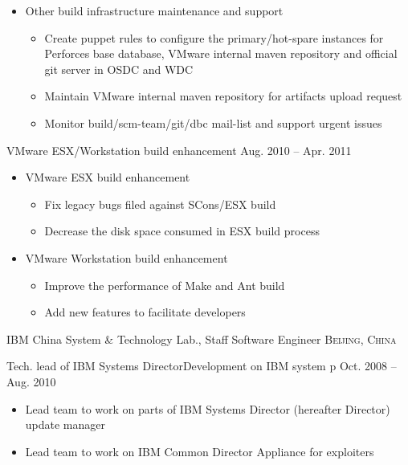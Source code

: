 \documentclass[10pt,letterpaper]{article}
\begin{document}
{{\begin{itemize}
\begin{itemize}
                \item   Maintain VMware legacy gitorious server and fix bugs
            \end{itemize}
        \item Other build infrastructure maintenance and support
            \begin{itemize}
                \item   Create puppet rules to configure the primary/hot-spare instances for
                    Perforces base database, VMware internal maven repository and official git
                    server in OSDC and WDC
                \item   Maintain VMware internal maven repository for artifacts upload request
                \item   Monitor build/scm-team/git/dbc mail-list and support urgent issues
            \end{itemize}

    \end{itemize}
}
\headedsubsection %
{VMware ESX/Workstation build enhancement} {Aug. 2010 -- Apr. 2011}
{
    \begin{itemize}
        \item VMware ESX build enhancement
            \begin{itemize}
                \item   Fix legacy bugs filed against SCons/ESX build
                \item   Decrease the disk space consumed in ESX build process
            \end{itemize}
        \item VMware Workstation build enhancement
            \begin{itemize}
            \item   Improve the performance of Make and Ant build
            \item   Add new features to facilitate developers
            \end{itemize}
    \end{itemize}
}
}




\headedsection 
{IBM China System \& Technology Lab., Staff Software Engineer}
{\textsc{Beijing, China}} {

\headedsubsection %
{Tech. lead of IBM Systems Director\texttrademark Development on IBM system p}
{Oct. 2008 -- Aug. 2010}
{
    \begin{itemize}
        \item Lead team to work on parts of IBM Systems Director\texttrademark
            (hereafter Director) update manager
        \item Lead team to work on IBM Common Director Appliance for exploiters
    \end{itemize}
}
}
\end{document}
